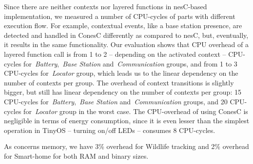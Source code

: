 Since there are neither contexts nor layered functions in nesC-based
implementation, we measured a number of CPU-cycles of parts with different
execution flow. For example, contextual events, like a base station presence,
are detected and handled in ConesC differently as compared to nesC, but,
eventually, it results in the same functionality. Our evaluation shows that CPU overhead of
a layered function call is from 1 to 2 -- depending on the activated context -- CPU-cycles
for~\emph{Battery},~\emph{Base Station} and~\emph{Communication} groups, and from
1 to 3 CPU-cycles for~\emph{Locator} group, which leads us to the linear dependency on the
number of contexts per group. The overhead of context transitions is slightly bigger, but still has
linear dependency on the number of contexts per group: 15 CPU-cycles
for~\emph{Battery},~\emph{Base Station} and~\emph{Communication} groups, and 20
CPU-cycles for~\emph{Locator} group in the worst case. The CPU-overhead of using ConesC is
negligible in terms of energy consumption, since it is even lesser than the simplest operation in
TinyOS -- turning on/off LEDs -- consumes 8 CPU-cycles.

As concerns memory, we have 3\% overhead for Wildlife tracking and 2\% overhead
for Smart-home for both RAM and binary sizes.
